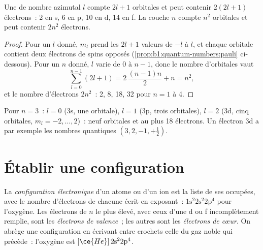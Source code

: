 \begin{proposition}\label{prop:b1:quantum-numbers:capacity}
Une  de nombre azimutal $l$ compte $2l + 1$ orbitales et
peut contenir $2(2l + 1)$ électrons~: 2 en s, 6 en p, 10 en d, 14 en f.
La couche $n$ compte $n^2$ orbitales et peut contenir $2n^2$ électrons.
\end{proposition}

\begin{proof}
Pour un $l$ donné, $m_l$ prend les $2l + 1$ valeurs de $-l$ à $l$, et
chaque orbitale contient deux électrons de spins opposés (\cref{prop:b1:quantum-numbers:pauli}
ci-dessous). Pour un $n$ donné, $l$ varie de $0$ à $n - 1$, donc le
nombre d'orbitales vaut
\[
  \sum_{l=0}^{n-1} (2l+1) = 2\,\frac{(n-1)n}{2} + n = n^2 ,
\]
et le nombre d'électrons $2n^2$~: 2, 8, 18, 32 pour $n = 1$ à 4.
\end{proof}

\begin{example}\label{ex:b1:quantum-numbers:third}
Pour $n = 3$~: $l = 0$ (3s, une orbitale), $l = 1$ (3p, trois
orbitales), $l = 2$ (3d, cinq orbitales, $m_l = -2, \dots, 2$)~: neuf
orbitales et au plus 18 électrons. Un électron 3d a par exemple les
nombres quantiques $(3, 2, -1, +\tfrac12)$.
\end{example}

\section{Établir une configuration}

\begin{definition}\label{def:b1:quantum-numbers:configuration}
La \emph{configuration électronique} d'un
atome ou d'un ion est la liste de ses  occupées, avec le
nombre d'électrons de chacune écrit en exposant~: $1\text{s}^2 2\text{s}^2
2\text{p}^4$ pour l'oxygène. Les électrons de $n$ le plus élevé, avec
ceux d'une  d ou f incomplètement remplie, sont les \emph{électrons
de valence}~; les autres sont les \emph{électrons de
cœur}. On abrège une configuration en écrivant entre
crochets celle du gaz noble qui précède~:
l'oxygène est $[\ce{He}]\,2\text{s}^2 2\text{p}^4$.
\end{definition}

